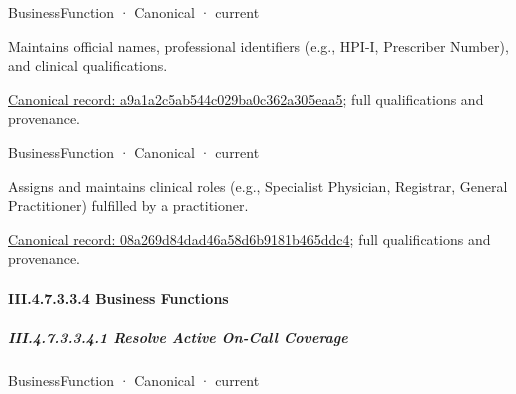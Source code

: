 \label{navigation:III.4.7.3.3.3.2.1}

\label{element:a9a1a2c5ab544c029ba0c362a305eaa5}
{\small BusinessFunction · Canonical · current}\par

Maintains official names, professional identifiers (e.g., HPI-I, Prescriber Number), and clinical qualifications.


{\footnotesize \href{../../../../../../../../continuum/business/business-function/a9a1a2c5ab544c029ba0c362a305eaa5.md}{Canonical record: a9a1a2c5ab544c029ba0c362a305eaa5}; full qualifications and provenance.}\par
{}
\label{navigation:III.4.7.3.3.3.2.2}

\label{element:08a269d84dad46a58d6b9181b465ddc4}
{\small BusinessFunction · Canonical · current}\par

Assigns and maintains clinical roles (e.g., Specialist Physician, Registrar, General Practitioner) fulfilled by a practitioner.


{\footnotesize \href{../../../../../../../../continuum/business/business-function/08a269d84dad46a58d6b9181b465ddc4.md}{Canonical record: 08a269d84dad46a58d6b9181b465ddc4}; full qualifications and provenance.}\par
\paragraph*{III.4.7.3.3.4 Business Functions}
\label{navigation:III.4.7.3.3.4}

\subparagraph*{III.4.7.3.3.4.1 Resolve Active On-Call Coverage}
\label{navigation:III.4.7.3.3.4.1}

\label{element:a88d3779091140c6b90f98d550b5387f}
{\small BusinessFunction · Canonical · current}\par

